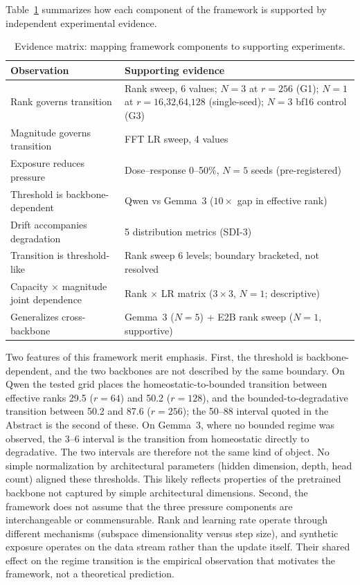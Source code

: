 \documentclass[a4paper,fleqn]{cas-dc}
\newif\ifshowchanges
\newcommand{\rev}[1]{\ifshowchanges{\color{blue}#1}\else{#1}\fi}
\renewcommand{\arraystretch}{1.8}
\begin{document}
Table~\ref{tab:evidence} summarizes how each component of the framework is
supported by independent experimental evidence.

\begin{table}[pos=htbp]
\caption{Evidence matrix: mapping framework components to supporting
experiments.}\label{tab:evidence}
\footnotesize
\renewcommand{\arraystretch}{1.4}
\begin{tabularx}{\columnwidth}{@{}lX@{}}
\toprule
\textbf{Observation} & \textbf{Supporting evidence} \\
\midrule
Rank governs transition & Rank sweep, 6 values; $N{=}3$ at $r{=}256$ (G1); $N{=}1$ at $r{=}16$,$32$,$64$,$128$ (single-seed); $N{=}3$ bf16 control (G3) \\
\addlinespace
Magnitude governs transition & FFT LR sweep, 4 values \\
\addlinespace
Exposure reduces pressure & Dose--response 0--50\%, $N{=}5$ seeds (pre-registered) \\
\addlinespace
Threshold is backbone-dependent & Qwen vs Gemma~3 ($10{\times}$ gap in effective rank) \\
\addlinespace
Drift accompanies degradation & 5 distribution metrics (SDI-3) \\
\addlinespace
Transition is threshold-like & Rank sweep 6 levels; boundary bracketed, not resolved \\
\addlinespace
Capacity $\times$ magnitude joint dependence & Rank $\times$ LR matrix ($3{\times}3$, $N{=}1$; descriptive) \\
\addlinespace
Generalizes cross-backbone & Gemma~3 ($N{=}5$) + E2B rank sweep ($N{=}1$, supportive) \\
\bottomrule
\end{tabularx}
\end{table}

Two features of this framework merit emphasis. First, the threshold is backbone-dependent, and the two backbones are
not described by the same boundary. \rev{On Qwen the tested grid places
the homeostatic-to-bounded transition between effective ranks 29.5
($r=64$) and 50.2 ($r=128$), and the bounded-to-degradative transition
between 50.2 and 87.6 ($r=256$); the 50--88 interval quoted in the
Abstract is the second of these. On Gemma~3, where no bounded regime
was observed, the 3--6 interval is the transition from homeostatic
directly to degradative. The two intervals are therefore not the same
kind of object.}
No simple normalization by architectural
parameters (hidden dimension, depth, head count) aligned these thresholds. This
likely reflects properties of the pretrained backbone not captured by simple
architectural dimensions. Second, the framework does not assume that the three
pressure components are interchangeable or commensurable. Rank and learning rate
operate through different mechanisms (subspace dimensionality versus step size),
and synthetic exposure operates on the data stream rather than the update
itself. Their shared effect on the regime transition is the empirical
observation that motivates the framework, not a theoretical prediction.
\end{document}
